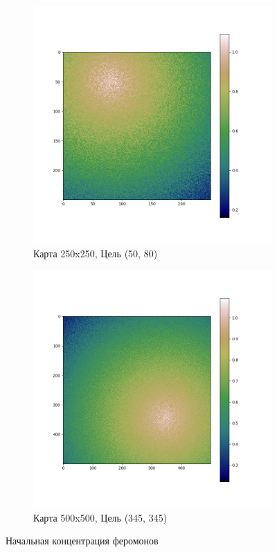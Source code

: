 \documentclass{article}
\numberwithin{equation}{section}
\begin{document}
			\begin{figure}[H]
				\vspace{-0.5cm}
				\centering
				\begin{subfigure}[b]{0.49\textwidth}
					\includegraphics[width=\textwidth]{data/heuristics_example/pheromone_250x250.png}
					\caption*{Карта 250x250, Цель (50, 80)}
				\end{subfigure}
				\begin{subfigure}[b]{0.49\textwidth}
					\includegraphics[width=\textwidth]{data/heuristics_example/pheromone_500x500.png}
					\caption*{Карта 500x500, Цель (345, 345)}
				\end{subfigure}
				\caption{Начальная концентрация феромонов}\label{fig:pher}
			\end{figure}
\end{document}
